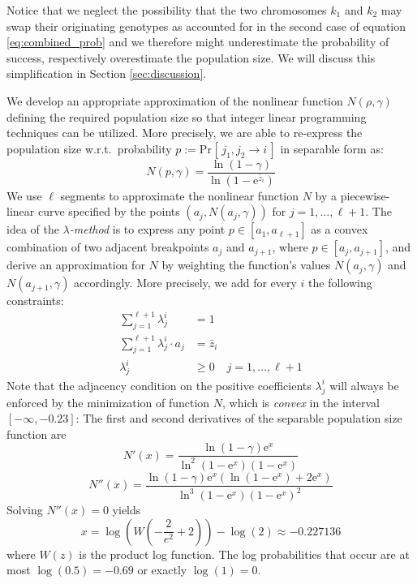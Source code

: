 \documentclass[runningheads]{llncs}
\renewcommand{\Pr}[2][]{\mathrm{Pr}_{#1} [\, #2 \, ]}
\begin{document}


Notice that we neglect the possibility that the two chromosomes $k_1$ and $k_2$ may swap their originating genotypes as accounted for in the 
second case of equation \eqref{eq:combined_prob} and we therefore might underestimate the probability of success, respectively overestimate
the population size. We will discuss this simplification in Section \ref{sec:discussion}.

We develop an appropriate approximation of the nonlinear function $N(\rho, \gamma)$ defining the required population size so that integer linear 
programming techniques can be utilized.
More precisely, we are able to re-express the population size w.r.t.\ probability $p:=\Pr[]{j_1,j_2\rightarrow i}$ in separable form as: 
$$ N(p,\gamma) = \frac{\ln(1-\gamma)}{\ln(1-\mathrm e^{\bar{z}_i})} $$
We use $\ell$ segments to approximate the nonlinear function $N$ by a
piecewise-linear curve specified by the points $(a_j,N(a_j,\gamma))$ for
$j=1,\dots,\ell+1$. The idea of the \emph{$\lambda$-method} \cite{Steuer:1986} is to
express any point $p\in[a_1,a_{\ell+1}]$ as a convex combination of two adjacent
breakpoints $a_j$ and $a_{j+1}$, where  $p\in[a_j,a_{j+1}]$, and derive an
approximation for $N$ by weighting the function's values $N(a_j,\gamma)$ and
$N(a_{j+1},\gamma)$ accordingly. More precisely, we add for every $i$ the following
constraints:
\begin{align}
  \sum_{j=1}^{\ell+1} \lambda^i_j &= 1&\\
  \sum_{j=1}^{\ell+1} \lambda^i_j\cdot a_j &= \bar{z}_i&\label{ttt}\\
  \lambda^i_j&\geq 0& j=1,\dots,\ell+1
\end{align}
Note that the adjacency condition on the positive coefficients $\lambda^i_j$ will
always be enforced by the minimization of function $N$, which is \emph{convex}
in the interval $[-\infty,-0.23]$:
The first and second derivatives of the separable population size function are
$$N'(x)=\frac{\ln(1-\gamma)\mathrm e^x}{\ln^2(1-\mathrm e^x)(1-\mathrm e^x)}$$
$$N''(x)=\frac{\ln(1-\gamma)\mathrm e^x\left(\ln(1-\mathrm e^x)+2\mathrm e^x\right)}{\ln^3(1-\mathrm e^x)(1-\mathrm e^x)^2}$$
Solving $N''(x) = 0$ yields
\[
x = \log(W\left(-\frac{2}{e^2}+2\right)) - \log(2) \approx -0.227136
\]
where $W(z)$ is the product log function.
The log probabilities that occur are at most $\log(0.5) = -0.69$ or exactly $\log(1)=0$. 
\end{document}
